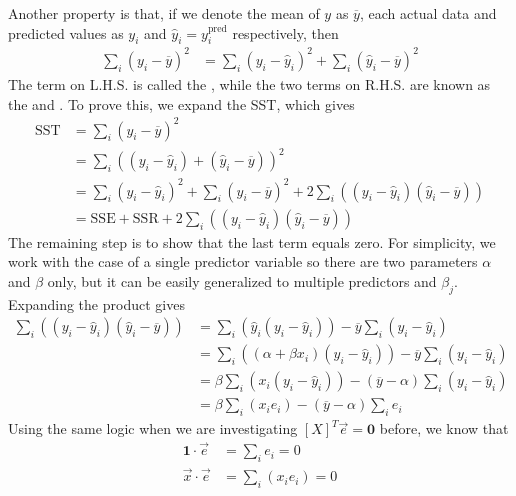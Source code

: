 Another property is that, if we denote the mean of $y$ as $\overline{y}$, each actual data and predicted values as $y_i$ and $\hat{y}_i = y^{\text{pred}}_i$ respectively, then
\begin{align}
\sum_i (y_i - \overline{y})^2 &= \sum_i (y_i - \hat{y}_i)^2 + \sum_i (\hat{y}_i - \overline{y})^2
\end{align}
The term on L.H.S. is called the , while the two terms on R.H.S. are known as the  and . To prove this, we expand the SST, which gives
\begin{align}
\text{SST} &= \sum_i (y_i - \overline{y})^2 \nonumber \\
&= \sum_i ((y_i - \hat{y}_i) + (\hat{y}_i - \overline{y}))^2 \nonumber \\
&= \sum_i (y_i - \hat{y}_i)^2 + \sum_i (\hat{y}_i - \overline{y})^2 + 2\sum_i ((y_i - \hat{y}_i) (\hat{y}_i - \overline{y})) \nonumber \\
&= \text{SSE} + \text{SSR} + 2\sum_i ((y_i - \hat{y}_i) (\hat{y}_i - \overline{y}))
\end{align}
The remaining step is to show that the last term equals zero. For simplicity, we work with the case of a single predictor variable so there are two parameters $\alpha$ and $\beta$ only, but it can be easily generalized to multiple predictors and $\beta_j$. Expanding the product gives
\begin{align}
\sum_i ((y_i - \hat{y}_i) (\hat{y}_i - \overline{y})) &= \sum_i (\hat{y}_i(y_i - \hat{y}_i)) - \overline{y} \sum_i (y_i - \hat{y}_i) \nonumber \\
&= \sum_i ((\alpha + \beta x_i)(y_i - \hat{y}_i)) - \overline{y} \sum_i (y_i - \hat{y}_i) \nonumber \\
&= \beta \sum_i (x_i(y_i - \hat{y}_i)) - (\overline{y} - \alpha) \sum_i (y_i - \hat{y}_i) \nonumber \\
&= \beta \sum_i (x_i e_i) - (\overline{y} - \alpha) \sum_i e_i
\end{align}
Using the same logic when we are investigating $[X]^T\vec{e} = \textbf{0}$ before, we know that
\begin{subequations}
\begin{align}
\textbf{1} \cdot \vec{e} &= \sum_i e_i = 0 \\
\vec{x} \cdot \vec{e} &= \sum_i (x_i e_i) = 0
\end{align}    
\end{subequations}
